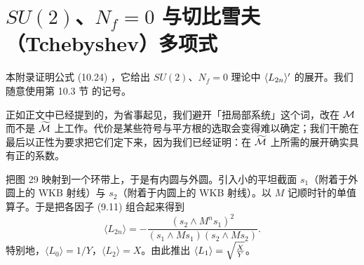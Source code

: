 \section{$SU(2)$、$N_f = 0$ 与切比雪夫（Tchebyshev）多项式} \label{app:chebyshev}

本附录证明公式 (10.24)%
，它给出 $SU(2)$、$N_f = 0$ 理论中 $\langle L_{2n} \rangle'$ 的展开。我们随意使用第 10.3 节%
的记号。

正如正文中已经提到的，为省事起见，我们避开「扭局部系统」这个词，改在 $\mathcal{M}$ 而不是 $\widetilde{\cal M}$ 上工作。代价是某些符号与平方根的选取会变得难以确定；我们干脆在最后以正性为要求把它们定下来，因为我们已经证明：在 $\widetilde{\cal M}$ 上所需的展开确实具有正的系数。

把图 29%
映射到一个环带上，于是有内圆与外圆。引入小的平坦截面 $s_1$（附着于外圆上的 WKB 射线）与 $s_2$（附着于内圆上的 WKB 射线）。以 $M$ 记顺时针的单值算子。于是把各因子 (9.11)%
组合起来得到
\begin{equation}
\langle L_{2n} \rangle = - \frac{ (s_2 \wedge M^n s_1)^2 }{(s_1 \wedge M s_1 )(s_2 \wedge M s_2) }.
\end{equation}
特别地，$\langle L_0 \rangle = 1/Y$，$\langle L_2 \rangle = X$。由此推出 $\langle L_1 \rangle = \sqrt{\frac{X}{Y}}$。

